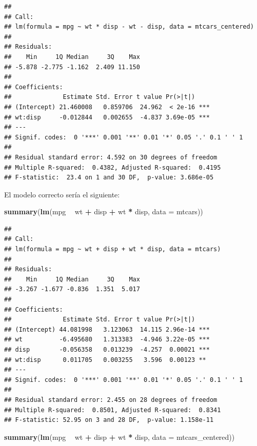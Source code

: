 \documentclass[
  12pt,
]{book}
\newenvironment{Shaded}{\begin{snugshade}}{\end{snugshade}}
\newcommand{\DataTypeTok}[1]{\textcolor[rgb]{0.13,0.29,0.53}{#1}}
\newcommand{\KeywordTok}[1]{\textcolor[rgb]{0.13,0.29,0.53}{\textbf{#1}}}
\newcommand{\NormalTok}[1]{#1}
\newcommand{\OperatorTok}[1]{\textcolor[rgb]{0.81,0.36,0.00}{\textbf{#1}}}
\newcommand{\StringTok}[1]{\textcolor[rgb]{0.31,0.60,0.02}{#1}}
\theoremstyle{definition}
\theoremstyle{definition}
\theoremstyle{definition}
\theoremstyle{remark}
\begin{document}
\begin{verbatim}
## 
## Call:
## lm(formula = mpg ~ wt * disp - wt - disp, data = mtcars_centered)
## 
## Residuals:
##    Min     1Q Median     3Q    Max 
## -5.878 -2.775 -1.162  2.409 11.150 
## 
## Coefficients:
##              Estimate Std. Error t value Pr(>|t|)    
## (Intercept) 21.460008   0.859706  24.962  < 2e-16 ***
## wt:disp     -0.012844   0.002655  -4.837 3.69e-05 ***
## ---
## Signif. codes:  0 '***' 0.001 '**' 0.01 '*' 0.05 '.' 0.1 ' ' 1
## 
## Residual standard error: 4.592 on 30 degrees of freedom
## Multiple R-squared:  0.4382, Adjusted R-squared:  0.4195 
## F-statistic:  23.4 on 1 and 30 DF,  p-value: 3.686e-05
\end{verbatim}

El modelo correcto sería el siguiente:

\begin{Shaded}
\begin{Highlighting}[]
\KeywordTok{summary}\NormalTok{(}\KeywordTok{lm}\NormalTok{(mpg }\OperatorTok{~}\StringTok{ }\NormalTok{wt }\OperatorTok{+}\StringTok{ }\NormalTok{disp }\OperatorTok{+}\StringTok{ }\NormalTok{wt }\OperatorTok{*}\StringTok{ }\NormalTok{disp, }\DataTypeTok{data =}\NormalTok{ mtcars))}
\end{Highlighting}
\end{Shaded}

\begin{verbatim}
## 
## Call:
## lm(formula = mpg ~ wt + disp + wt * disp, data = mtcars)
## 
## Residuals:
##    Min     1Q Median     3Q    Max 
## -3.267 -1.677 -0.836  1.351  5.017 
## 
## Coefficients:
##              Estimate Std. Error t value Pr(>|t|)    
## (Intercept) 44.081998   3.123063  14.115 2.96e-14 ***
## wt          -6.495680   1.313383  -4.946 3.22e-05 ***
## disp        -0.056358   0.013239  -4.257  0.00021 ***
## wt:disp      0.011705   0.003255   3.596  0.00123 ** 
## ---
## Signif. codes:  0 '***' 0.001 '**' 0.01 '*' 0.05 '.' 0.1 ' ' 1
## 
## Residual standard error: 2.455 on 28 degrees of freedom
## Multiple R-squared:  0.8501, Adjusted R-squared:  0.8341 
## F-statistic: 52.95 on 3 and 28 DF,  p-value: 1.158e-11
\end{verbatim}

\begin{Shaded}
\begin{Highlighting}[]
\KeywordTok{summary}\NormalTok{(}\KeywordTok{lm}\NormalTok{(mpg }\OperatorTok{~}\StringTok{ }\NormalTok{wt }\OperatorTok{+}\StringTok{ }\NormalTok{disp }\OperatorTok{+}\StringTok{ }\NormalTok{wt }\OperatorTok{*}\StringTok{ }\NormalTok{disp, }\DataTypeTok{data =}\NormalTok{ mtcars_centered))}
\end{Highlighting}
\end{Shaded}
\end{document}
